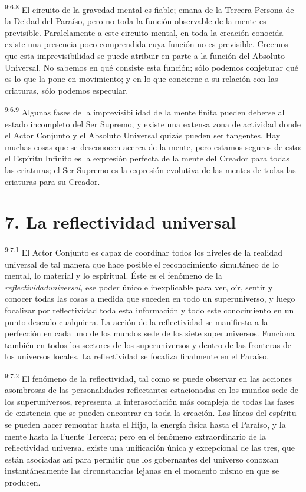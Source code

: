 \par
\textsuperscript{9:6.8} El circuito de la gravedad mental es fiable; emana de la Tercera Persona de la Deidad del Paraíso, pero no toda la función observable de la mente es previsible. Paralelamente a este circuito mental, en toda la creación conocida existe una presencia poco comprendida cuya función no es previsible. Creemos que esta imprevisibilidad se puede atribuir en parte a la función del Absoluto Universal. No sabemos en qué consiste esta función; sólo podemos conjeturar qué es lo que la pone en movimiento; y en lo que concierne a su relación con las criaturas, sólo podemos especular.

\par
\textsuperscript{9:6.9} Algunas fases de la imprevisibilidad de la mente finita pueden deberse al estado incompleto del Ser Supremo, y existe una extensa zona de actividad donde el Actor Conjunto y el Absoluto Universal quizás pueden ser tangentes. Hay muchas cosas que se desconocen acerca de la mente, pero estamos seguros de esto: el Espíritu Infinito es la expresión perfecta de la mente del Creador para todas las criaturas; el Ser Supremo es la expresión evolutiva de las mentes de todas las criaturas para su Creador.

\section*{7. La reflectividad universal}
\par
\textsuperscript{9:7.1} El Actor Conjunto es capaz de coordinar todos los niveles de la realidad universal de tal manera que hace posible el reconocimiento simultáneo de lo mental, lo material y lo espiritual. Éste es el fenómeno de la \textit{reflectividaduniversal,} ese poder único e inexplicable para ver, oír, sentir y conocer todas las cosas a medida que suceden en todo un superuniverso, y luego focalizar por reflectividad toda esta información y todo este conocimiento en un punto deseado cualquiera. La acción de la reflectividad se manifiesta a la perfección en cada uno de los mundos sede de los siete superuniversos. Funciona también en todos los sectores de los superuniversos y dentro de las fronteras de los universos locales. La reflectividad se focaliza finalmente en el Paraíso.

\par
\textsuperscript{9:7.2} El fenómeno de la reflectividad, tal como se puede observar en las acciones asombrosas de las personalidades reflectantes estacionadas en los mundos sede de los superuniversos, representa la interasociación más compleja de todas las fases de existencia que se pueden encontrar en toda la creación. Las líneas del espíritu se pueden hacer remontar hasta el Hijo, la energía física hasta el Paraíso, y la mente hasta la Fuente Tercera; pero en el fenómeno extraordinario de la reflectividad universal existe una unificación única y excepcional de las tres, que están asociadas así para permitir que los gobernantes del universo conozcan instantáneamente las circunstancias lejanas en el momento mismo en que se producen.

